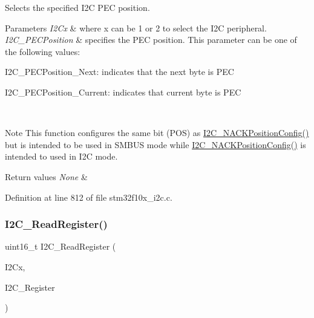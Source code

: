 Selects the specified I2C P\+EC position. 


\begin{DoxyParams}{Parameters}
{\em I2\+Cx} & where x can be 1 or 2 to select the I2C peripheral. \\
\hline
{\em I2\+C\+\_\+\+P\+E\+C\+Position} & specifies the P\+EC position. This parameter can be one of the following values\+: \begin{DoxyItemize}
\item I2\+C\+\_\+\+P\+E\+C\+Position\+\_\+\+Next\+: indicates that the next byte is P\+EC \item I2\+C\+\_\+\+P\+E\+C\+Position\+\_\+\+Current\+: indicates that current byte is P\+EC\end{DoxyItemize}
\\
\hline
\end{DoxyParams}
\begin{DoxyNote}{Note}
This function configures the same bit (P\+OS) as \hyperlink{group___i2_c___private___functions_gad08ebffc3a234d84e6405ec115bd74f1}{I2\+C\+\_\+\+N\+A\+C\+K\+Position\+Config()} but is intended to be used in S\+M\+B\+US mode while \hyperlink{group___i2_c___private___functions_gad08ebffc3a234d84e6405ec115bd74f1}{I2\+C\+\_\+\+N\+A\+C\+K\+Position\+Config()} is intended to used in I2C mode.
\end{DoxyNote}

\begin{DoxyRetVals}{Return values}
{\em None} & \\
\hline
\end{DoxyRetVals}


Definition at line 812 of file stm32f10x\+\_\+i2c.\+c.

\mbox{\label{group___i2_c___exported___functions_ga8021dc796d15f997356b0583d6346805}} 
\subsubsection{\texorpdfstring{I2\+C\+\_\+\+Read\+Register()}{I2C\_ReadRegister()}}
{\footnotesize\ttfamily uint16\+\_\+t I2\+C\+\_\+\+Read\+Register (\begin{DoxyParamCaption}\item[{\hyperlink{struct_i2_c___type_def}{I2\+C\+\_\+\+Type\+Def} $\ast$}]{I2\+Cx,  }\item[{uint8\+\_\+t}]{I2\+C\+\_\+\+Register }\end{DoxyParamCaption})}




